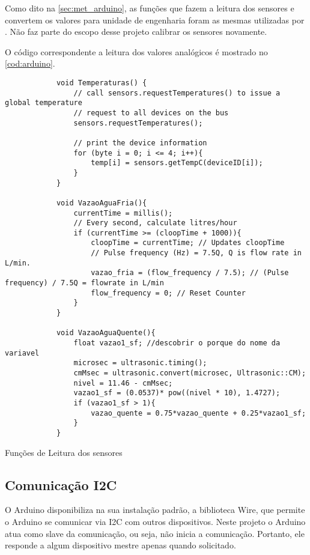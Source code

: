 		Como dito na \autoref{sec:met_arduino}, as funções que fazem a leitura dos sensores e convertem os valores para unidade de engenharia foram as mesmas utilizadas por \textcite{luiz2016}. Não faz parte do escopo desse projeto calibrar os sensores novamente.
		
		O código correspondente a leitura dos valores analógicos é mostrado no \autoref*{cod:arduino}. 
		
		
		\begin{listing}
			\begin{verbatim}
			void Temperaturas() {
				// call sensors.requestTemperatures() to issue a global temperature 
				// request to all devices on the bus
				sensors.requestTemperatures();
				
				// print the device information
				for (byte i = 0; i <= 4; i++){
					temp[i] = sensors.getTempC(deviceID[i]);
				}
			}
			
			void VazaoAguaFria(){
				currentTime = millis();
				// Every second, calculate litres/hour
				if (currentTime >= (cloopTime + 1000)){
					cloopTime = currentTime; // Updates cloopTime
					// Pulse frequency (Hz) = 7.5Q, Q is flow rate in L/min.
					vazao_fria = (flow_frequency / 7.5); // (Pulse frequency) / 7.5Q = flowrate in L/min
					flow_frequency = 0; // Reset Counter
				}
			}
			
			void VazaoAguaQuente(){
				float vazao1_sf; //descobrir o porque do nome da variavel
				microsec = ultrasonic.timing();
				cmMsec = ultrasonic.convert(microsec, Ultrasonic::CM);
				nivel = 11.46 - cmMsec;
				vazao1_sf = (0.0537)* pow((nivel * 10), 1.4727);
				if (vazao1_sf > 1){
					vazao_quente = 0.75*vazao_quente + 0.25*vazao1_sf;
				}
			}	
			\end{verbatim}
			\caption{Funções de Leitura dos sensores}
			\label{cod:arduino}
		\end{listing}
	
		\subsection{Comunicação I2C}
			O Arduino disponibiliza na sua instalação padrão, a biblioteca Wire, que permite o Arduino se comunicar via I2C com outros dispositivos. Neste projeto o Arduino atua como slave da comunicação, ou seja, não inicia a comunicação. Portanto, ele responde a algum dispositivo mestre apenas quando solicitado.
			
